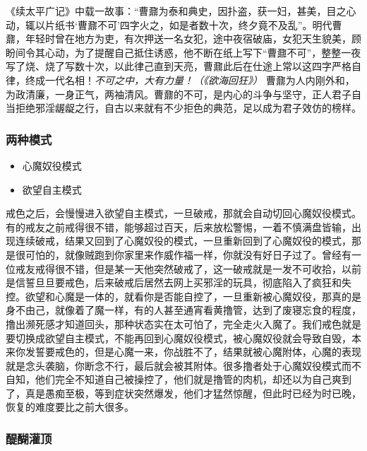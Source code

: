 《续太平广记》中载一故事：“曹鼐为泰和典史，因扑盗，获一妇，甚美，目之心动，辄以片纸书‘曹鼐不可’四字火之，如是者数十次，终夕竟不及乱”。明代曹鼐，年轻时曾在地方为吏，有次押送一名女犯，途中夜宿破庙，女犯天生貌美，顾盼间令其心动，为了提醒自己抵住诱惑，他不断在纸上写下“曹鼐不可”，整整一夜写了烧、烧了写数十次，以此律己直到天亮，曹鼐此后在仕途上常以这四字严格自律，终成一代名相！\textit{不可之中，大有力量！（《欲海回狂》）} 曹鼐为人内刚外和，为政清廉，一身正气，两袖清风。曹鼐的不可，是内心的斗争与坚守，正人君子自当拒绝邪淫龌龊之行，自古以来就有不少拒色的典范，足以成为君子效仿的榜样。

\subsubsection{两种模式}

\begin{multicols}{2}
    \begin{itemize}
        \item 心魔奴役模式
        \item 欲望自主模式
    \end{itemize}
\end{multicols}

戒色之后，会慢慢进入欲望自主模式，一旦破戒，那就会自动切回心魔奴役模式。有的戒友之前戒得很不错，能够超过百天，后来放松警惕，一着不慎满盘皆输，出现连续破戒，结果又回到了心魔奴役的模式，一旦重新回到了心魔奴役的模式，那是很可怕的，就像贼跑到你家里来作威作福一样，你就没有好日子过了。曾经有一位戒友戒得很不错，但是某一天他突然破戒了，这一破戒就是一发不可收拾，以前是信誓旦旦要戒色，后来破戒后居然去网上买邪淫的玩具，彻底陷入了疯狂和失控。欲望和心魔是一体的，就看你是否能自控了，一旦重新被心魔奴役，那真的是身不由己，就像着了魔一样，有的人甚至通宵看黄撸管，达到了废寝忘食的程度，撸出濒死感才知道回头，那种状态实在太可怕了，完全走火入魔了。我们戒色就是要切换成欲望自主模式，不能再回到心魔奴役模式，被心魔奴役就会导致自毁，本来你发誓要戒色的，但是心魔一来，你战胜不了，结果就被心魔附体，心魔的表现就是念头袭脑，你断念不行，最后就会被其附体。很多撸者处于心魔奴役模式而不自知，他们完全不知道自己被操控了，他们就是撸管的肉机，却还以为自己爽到了，真是愚痴至极，等到症状突然爆发，他们才猛然惊醒，但此时已经为时已晚，恢复的难度要比之前大很多。

\subsubsection{醍醐灌顶}

